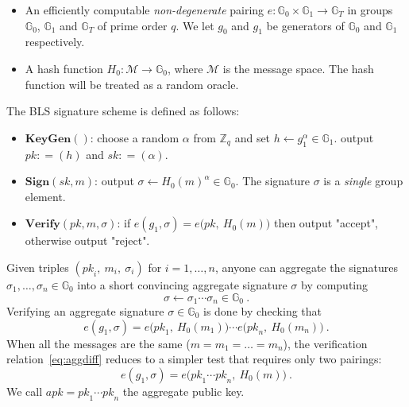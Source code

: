 \newcommand{\G}{\mathbb{G}}
\newcommand{\Z}{\mathbb{Z}}
\newcommand{\adv}{{\cal A}}
\newcommand{\bdv}{{\cal B}}
\newcommand{\deq}{\mathrel{\mathop:}=}
\newcommand{\SK}{\mathit{sk}}
\newcommand{\PK}{\mathit{pk}}
\newcommand{\C}{\mathit{cert}}
\newcommand{\APK}{\mathit{apk}}
\newcommand{\DPK}{\mathit{\Delta pk}}
\newcommand{\MM}{\mathcal{M}}
\newcommand{\xwedge}{\, \operatorname{\text{$\wedge$}}\, }
\newcommand{\abs}[1]{\lvert #1 \rvert}
\newcommand{\Hm}{H_0}
\newcommand{\Hpk}{H_1}
\newcommand{\qHpk}{Q_{\Hpk}}
\newcommand{\qHm}{Q_{\Hm}}
\newcommand{\qsig}{Q_{\text{sig}}}

\begin{itemize}
    \item An efficiently computable \emph{non-degenerate} pairing $e:\G_0 \times \G_1 \to \G_T$
    in groups $\G_0$, $\G_1$ and $\G_T$ of prime order $q$. We let $g_0$ and $g_1$ be generators
    of $\G_0$ and $\G_1$ respectively.
    \item A hash function $H_0: \mathcal{M} \rightarrow \mathbb{G}_0$, where $\mathcal{M}$ is the message space.
    The hash function will be treated as a random oracle.
\end{itemize}

The BLS signature scheme is defined as follows:

\begin{itemize}
    \item $\textbf{KeyGen}()$: choose a random $\alpha$ from $\Z_q$ and set $h \gets g_1^\alpha \in \G_1$.
    output $\PK \deq (h)$ and $\SK \deq (\alpha)$.
    \item $\textbf{Sign}(\SK, m)$: output $\sigma \gets \Hm(m)^\alpha \in \G_0$.
    The signature $\sigma$ is a \emph{single} group element.
    \item $\textbf{Verify}(\PK,m,\sigma)$: if $e(g_1, \sigma) = e\big(\PK,\ \Hm(m)\big)$  then output "accept",
    otherwise output "reject".
\end{itemize}

Given triples $(\PK_i,\ m_i,\ \sigma_i)$ for $i=1,\ldots,n$,
anyone can aggregate the signatures $\sigma_1,\ldots,\sigma_n \in \G_0$
into a short convincing aggregate signature $\sigma$ by computing
\begin{equation}
    \label{eq:agg}
    \sigma \gets \sigma_1 \cdots \sigma_n \in \G_0\ .
\end{equation}
Verifying an aggregate signature $\sigma \in \G_0$ is done by checking that
\begin{equation}
    \label{eq:aggdiff}
    e(g_1, \sigma) = e\big(\PK_1,\ \Hm(m_1)\big) \cdots e\big(\PK_n,\ \Hm(m_n)\big)\ .
\end{equation}
When all the messages are the same ($m = m_1 = \ldots = m_n$), the verification relation~\eqref{eq:aggdiff} reduces to
a simpler test that requires only two pairings:
\begin{equation}
    \label{eq:aggsame}
    e(g_1, \sigma) = e\Big(\PK_1 \cdots \PK_n,\ \Hm(m)\Big)\ .
\end{equation}
We call $\APK=\PK_1 \cdots \PK_n$ the aggregate public key.

